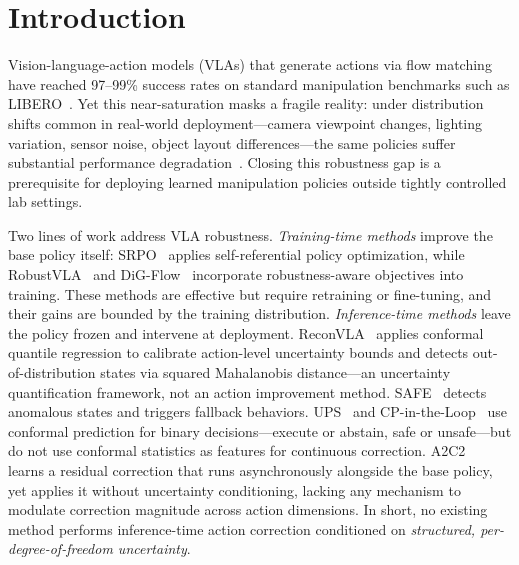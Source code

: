 \section{Introduction}
\label{sec:intro}

Vision-language-action models (VLAs) that generate actions via flow matching~\cite{black2024pi0,shukor2025smolvla} have reached 97--99\% success rates on standard manipulation benchmarks such as LIBERO~\cite{liu2023libero}.
Yet this near-saturation masks a fragile reality: under distribution shifts common in real-world deployment---camera viewpoint changes, lighting variation, sensor noise, object layout differences---the same policies suffer substantial performance degradation~\cite{fei2025liberoplus}.
Closing this robustness gap is a prerequisite for deploying learned manipulation policies outside tightly controlled lab settings.

Two lines of work address VLA robustness.
\emph{Training-time methods} improve the base policy itself: SRPO~\cite{srpo2025} applies self-referential policy optimization, while RobustVLA~\cite{robustvla2025} and DiG-Flow~\cite{digflow2025} incorporate robustness-aware objectives into training.
These methods are effective but require retraining or fine-tuning, and their gains are bounded by the training distribution.
\emph{Inference-time methods} leave the policy frozen and intervene at deployment.
ReconVLA~\cite{chen2026reconvla} applies conformal quantile regression to calibrate action-level uncertainty bounds and detects out-of-distribution states via squared Mahalanobis distance---an uncertainty quantification framework, not an action improvement method.
SAFE~\cite{gu2025safe} detects anomalous states and triggers fallback behaviors.
UPS~\cite{yuan2026ups} and CP-in-the-Loop~\cite{wang2025cploop} use conformal prediction for binary decisions---execute or abstain, safe or unsafe---but do not use conformal statistics as features for continuous correction.
A2C2~\cite{a2c2_2025} learns a residual correction that runs asynchronously alongside the base policy, yet applies it without uncertainty conditioning, lacking any mechanism to modulate correction magnitude across action dimensions.
In short, no existing method performs inference-time action correction conditioned on \emph{structured, per-degree-of-freedom uncertainty}.

